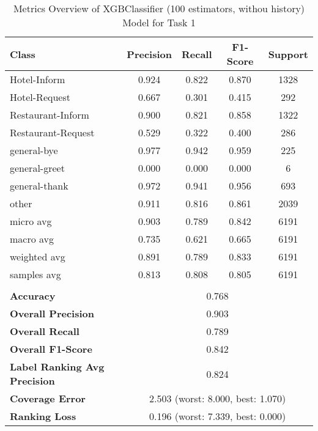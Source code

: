 
\begin{table}[h]
\centering

\begin{tabular}{|l|c|c|c|c|}
\hline
\textbf{Class}& \textbf{Precision} & \textbf{Recall} & \textbf{F1-Score} & \textbf{Support} \\ \hline
Hotel-Inform & 0.924 & 0.822 & 0.870 & 1328 \\ \hline
Hotel-Request & 0.667 & 0.301 & 0.415 & 292 \\ \hline
Restaurant-Inform & 0.900 & 0.821 & 0.858 & 1322 \\ \hline
Restaurant-Request & 0.529 & 0.322 & 0.400 & 286 \\ \hline
general-bye & 0.977 & 0.942 & 0.959 & 225 \\ \hline
general-greet & 0.000 & 0.000 & 0.000 & 6 \\ \hline
general-thank & 0.972 & 0.941 & 0.956 & 693 \\ \hline
other & 0.911 & 0.816 & 0.861 & 2039 \\ \hline\hline
micro avg & 0.903 & 0.789 & 0.842 & 6191 \\ \hline
macro avg & 0.735 & 0.621 & 0.665 & 6191 \\ \hline
weighted avg & 0.891 & 0.789 & 0.833 & 6191 \\ \hline
samples avg & 0.813 & 0.808 & 0.805 & 6191 \\ \hline
\multicolumn{5}{c}{}\\ \hline

\textbf{Accuracy}                    & \multicolumn{4}{c|}{0.768}                                 \\ \hline
\textbf{Overall Precision}           & \multicolumn{4}{c|}{0.903}                                \\ \hline
\textbf{Overall Recall}              & \multicolumn{4}{c|}{0.789}                                   \\ \hline
\textbf{Overall F1-Score}            & \multicolumn{4}{c|}{0.842}                                  \\ \hline
\textbf{Label Ranking Avg Precision} & \multicolumn{4}{c|}{0.824}                                    \\ \hline
\textbf{Coverage Error}              & \multicolumn{4}{c|}{2.503 (worst: 8.000, best: 1.070)}                             \\ \hline
\textbf{Ranking Loss}                & \multicolumn{4}{c|}{0.196 (worst: 7.339, best: 0.000)}                             \\ \hline
\end{tabular}

\caption{Metrics Overview of XGBClassifier (100 estimators, withou history) Model for Task 1}
\label{table:XGBClassifier (100 estimators, withou history)_metrics_task_1}
\end{table}
    